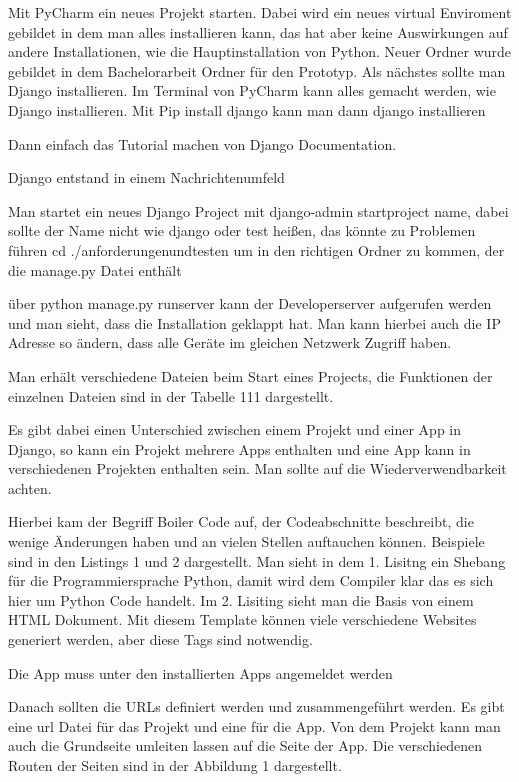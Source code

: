 \documentclass[11pt,a4paper]{report}
\begin{document}
Mit PyCharm ein neues Projekt starten. Dabei wird ein neues virtual Enviroment gebildet in dem man alles installieren kann, das hat aber keine Auswirkungen auf andere Installationen, wie die Hauptinstallation von Python. Neuer Ordner wurde gebildet in dem Bachelorarbeit Ordner für den Prototyp. Als nächstes sollte man Django installieren. Im Terminal von PyCharm kann alles gemacht werden, wie Django installieren. Mit Pip install django kann man dann django installieren

Dann einfach das Tutorial machen von Django Documentation.

Django entstand in einem Nachrichtenumfeld

Man startet ein neues Django Project mit django-admin startproject name, dabei sollte der Name nicht wie django oder test heißen, das könnte zu Problemen führen
cd ./anforderungenundtesten um in den richtigen Ordner zu kommen, der die manage.py Datei enthält

über python manage.py runserver kann der Developerserver aufgerufen werden und man sieht, dass die Installation geklappt hat. Man kann hierbei auch die IP Adresse so ändern, dass alle Geräte im gleichen Netzwerk Zugriff haben.

Man erhält verschiedene Dateien beim Start eines Projects, die Funktionen der einzelnen Dateien sind in der Tabelle 111 dargestellt. 


Es gibt dabei einen Unterschied zwischen einem Projekt und einer App in Django, so kann ein Projekt mehrere Apps enthalten und eine App kann in verschiedenen Projekten enthalten sein. Man sollte auf die Wiederverwendbarkeit achten.

Hierbei kam der Begriff Boiler Code auf, der Codeabschnitte beschreibt, die wenige Änderungen haben und an vielen Stellen auftauchen können. Beispiele sind in den Listings 1 und 2 dargestellt. Man sieht in dem 1. Lisitng ein Shebang für die Programmiersprache Python, damit wird dem Compiler klar das es sich hier um Python Code handelt. Im 2. Lisiting sieht man die Basis von einem HTML Dokument. Mit diesem Template können viele verschiedene Websites generiert werden, aber diese Tags sind notwendig. %

Die App muss unter den installierten Apps angemeldet werden


Danach sollten die URLs definiert werden und zusammengeführt werden. Es gibt eine url Datei für das Projekt und eine für die App. Von dem Projekt kann man auch die Grundseite umleiten lassen auf die Seite der App. Die verschiedenen Routen der Seiten sind in der Abbildung 1 dargestellt. 
\end{document}

